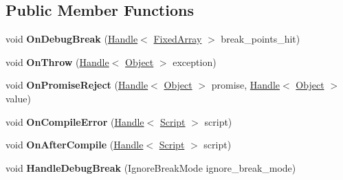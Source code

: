 \subsection*{Public Member Functions}
\begin{DoxyCompactItemize}
\item 
\mbox{\label{classv8_1_1internal_1_1Debug_a99c7033a2c26c6458d01ae07109da661}} 
void {\bfseries On\+Debug\+Break} (\mbox{\hyperlink{classv8_1_1internal_1_1Handle}{Handle}}$<$ \mbox{\hyperlink{classv8_1_1internal_1_1FixedArray}{Fixed\+Array}} $>$ break\+\_\+points\+\_\+hit)
\item 
\mbox{\label{classv8_1_1internal_1_1Debug_ab1394c52b67e43ccea0f0844324a5336}} 
void {\bfseries On\+Throw} (\mbox{\hyperlink{classv8_1_1internal_1_1Handle}{Handle}}$<$ \mbox{\hyperlink{classv8_1_1internal_1_1Object}{Object}} $>$ exception)
\item 
\mbox{\label{classv8_1_1internal_1_1Debug_a471276ef8f4b3944e5bb29d6be30bcb7}} 
void {\bfseries On\+Promise\+Reject} (\mbox{\hyperlink{classv8_1_1internal_1_1Handle}{Handle}}$<$ \mbox{\hyperlink{classv8_1_1internal_1_1Object}{Object}} $>$ promise, \mbox{\hyperlink{classv8_1_1internal_1_1Handle}{Handle}}$<$ \mbox{\hyperlink{classv8_1_1internal_1_1Object}{Object}} $>$ value)
\item 
\mbox{\label{classv8_1_1internal_1_1Debug_a9ac90b1fd7b555a797c838f97e083ea6}} 
void {\bfseries On\+Compile\+Error} (\mbox{\hyperlink{classv8_1_1internal_1_1Handle}{Handle}}$<$ \mbox{\hyperlink{classv8_1_1internal_1_1Script}{Script}} $>$ script)
\item 
\mbox{\label{classv8_1_1internal_1_1Debug_a93c2f89ac79abb686b6d3ee02074339d}} 
void {\bfseries On\+After\+Compile} (\mbox{\hyperlink{classv8_1_1internal_1_1Handle}{Handle}}$<$ \mbox{\hyperlink{classv8_1_1internal_1_1Script}{Script}} $>$ script)
\item 
\mbox{\label{classv8_1_1internal_1_1Debug_af9c3cfc5509aca81ab04ef53ffb725fd}} 
void {\bfseries Handle\+Debug\+Break} (Ignore\+Break\+Mode ignore\+\_\+break\+\_\+mode)
\item 
\mbox{\label{classv8_1_1internal_1_1Debug_a14843a893fe3710ceae38fe232ae2314}} 

\end{DoxyCompactItemize}
